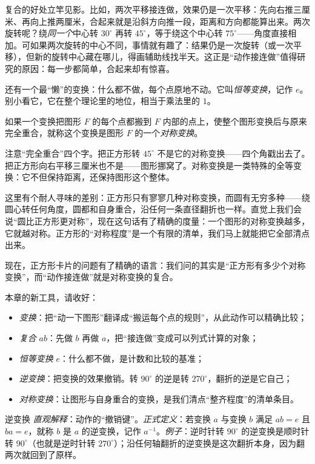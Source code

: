复合的好处立竿见影。比如，两次平移接连做，效果仍是一次平移：先向右推三厘米、再向上推两厘米，合起来就是沿斜方向推一段，距离和方向都能算出来。两次旋转呢？绕\emph{同一个}中心转 $30^\circ$ 再转 $45^\circ$，等于绕这个中心转 $75^\circ$——角度直接相加。可如果两次旋转的中心不同，事情就有趣了：结果仍是一次旋转（或一次平移），但新的旋转中心藏在哪儿，得画辅助线找半天。这正是“动作接连做”值得研究的原因：每一步都简单，合起来却有惊喜。

还有一个最“懒”的变换：什么都不做，每个点原地不动。它叫\emph{恒等变换}，记作 $e$。别小看它，它在整个理论里的地位，相当于乘法里的 $1$。

\begin{dingyi}[对称变换]
如果一个变换把图形 $F$ 的每个点都搬到 $F$ 内部的点上，使整个图形变换后与原来完全重合，就称这个变换是图形 $F$ 的一个\emph{对称变换}。
\end{dingyi}

注意“完全重合”四个字。把正方形转 $45^\circ$ 不是它的对称变换——四个角戳出去了。把正方形向右平移三厘米也不是——图形挪窝了。对称变换是一类特殊的全等变换：它不但保持距离，还保持图形这个整体。

这里有个耐人寻味的差别：正方形只有寥寥几种对称变换，而圆有无穷多种——绕圆心转任何角度，圆都和自身重合，沿任何一条直径翻折也一样。直觉上我们会说“圆比正方形更对称”，现在这句话有了精确的度量：一个图形的对称变换越多，它就越对称。正方形的“对称程度”是一个有限的清单，我们马上就能把它全部清点出来。

现在，正方形卡片的问题有了精确的语言：我们问的其实是“正方形有多少个对称变换”，而“动作接连做”就是对称变换的复合。

\begin{toolbox}
本章的新工具，请收好：
\begin{itemize}
  \item \emph{变换}：把“动一下图形”翻译成“搬运每个点的规则”，从此动作可以精确比较；
  \item \emph{复合} $ab$：先做 $b$ 再做 $a$，把“接连做”变成可以列式计算的对象；
  \item \emph{恒等变换} $e$：什么都不做，是计数和比较的基准；
  \item \emph{逆变换}：把变换的效果撤销。转 $90^\circ$ 的逆是转 $270^\circ$，翻折的逆是它自己；
  \item \emph{对称变换}：让图形与自身重合的变换，是我们清点“整齐程度”的清单条目。
\end{itemize}
\end{toolbox}

\begin{shuyu}{逆变换}
\emph{直观解释}：动作的“撤销键”。\emph{正式定义}：若变换 $a$ 与变换 $b$ 满足 $ab=e$ 且 $ba=e$，就称 $b$ 是 $a$ 的逆变换，记作 $a^{-1}$。\emph{例子}：逆时针转 $90^\circ$ 的逆变换是顺时针转 $90^\circ$（也就是逆时针转 $270^\circ$）；沿任何轴翻折的逆变换是这次翻折本身，因为翻两次就回到了原样。
\end{shuyu}

